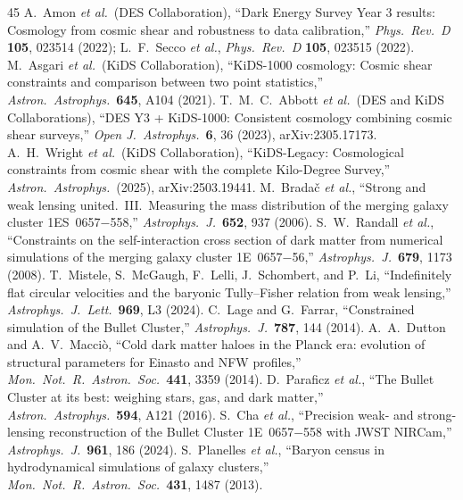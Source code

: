 \documentclass[11pt,a4paper]{article}
\begin{document}
\begin{thebibliography}{45}
 A.~Amon \textit{et al.}\ (DES Collaboration), ``Dark Energy Survey Year 3 results: Cosmology from cosmic shear and robustness to data calibration,'' \textit{Phys.\ Rev.\ D} \textbf{105}, 023514 (2022); L.~F.~Secco \textit{et al.}, \textit{Phys.\ Rev.\ D} \textbf{105}, 023515 (2022).
 M.~Asgari \textit{et al.}\ (KiDS Collaboration), ``KiDS-1000 cosmology: Cosmic shear constraints and comparison between two point statistics,'' \textit{Astron.\ Astrophys.}\ \textbf{645}, A104 (2021).
 T.~M.~C.~Abbott \textit{et al.}\ (DES and KiDS Collaborations), ``DES Y3 + KiDS-1000: Consistent cosmology combining cosmic shear surveys,'' \textit{Open J.\ Astrophys.}\ \textbf{6}, 36 (2023), arXiv:2305.17173.
 A.~H.~Wright \textit{et al.}\ (KiDS Collaboration), ``KiDS-Legacy: Cosmological constraints from cosmic shear with the complete Kilo-Degree Survey,'' \textit{Astron.\ Astrophys.}\ (2025), arXiv:2503.19441.
 M.~Brada\v{c} \textit{et al.}, ``Strong and weak lensing united.\ III.\ Measuring the mass distribution of the merging galaxy cluster 1ES~0657$-$558,'' \textit{Astrophys.\ J.}\ \textbf{652}, 937 (2006).
 S.~W.~Randall \textit{et al.}, ``Constraints on the self-interaction cross section of dark matter from numerical simulations of the merging galaxy cluster 1E~0657$-$56,'' \textit{Astrophys.\ J.}\ \textbf{679}, 1173 (2008).
 T.~Mistele, S.~McGaugh, F.~Lelli, J.~Schombert, and P.~Li, ``Indefinitely flat circular velocities and the baryonic Tully--Fisher relation from weak lensing,'' \textit{Astrophys.\ J.\ Lett.}\ \textbf{969}, L3 (2024).
 C.~Lage and G.~Farrar, ``Constrained simulation of the Bullet Cluster,'' \textit{Astrophys.\ J.}\ \textbf{787}, 144 (2014).
 A.~A.~Dutton and A.~V.~Macci\`o, ``Cold dark matter haloes in the Planck era: evolution of structural parameters for Einasto and NFW profiles,'' \textit{Mon.\ Not.\ R.\ Astron.\ Soc.}\ \textbf{441}, 3359 (2014).
 D.~Paraficz \textit{et al.}, ``The Bullet Cluster at its best: weighing stars, gas, and dark matter,'' \textit{Astron.\ Astrophys.}\ \textbf{594}, A121 (2016).
 S.~Cha \textit{et al.}, ``Precision weak- and strong-lensing reconstruction of the Bullet Cluster 1E~0657$-$558 with JWST NIRCam,'' \textit{Astrophys.\ J.}\ \textbf{961}, 186 (2024).
 S.~Planelles \textit{et al.}, ``Baryon census in hydrodynamical simulations of galaxy clusters,'' \textit{Mon.\ Not.\ R.\ Astron.\ Soc.}\ \textbf{431}, 1487 (2013).

\end{thebibliography}
\end{document}
